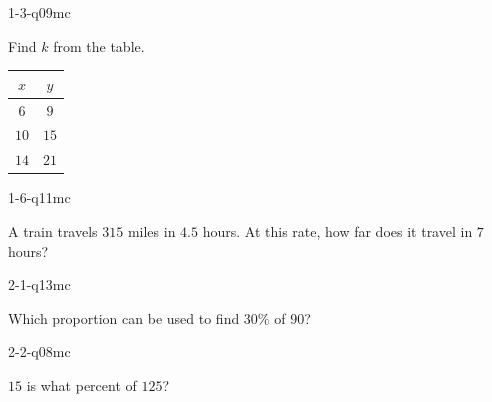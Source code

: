 
\begin{practiceQuestion}{1-3-q09}{mc}
\begin{questionText}
Find $k$ from the table.

\begin{center}
\begin{tabular}{|c|c|}
\hline $x$ & $y$ \\ \hline $6$ & $9$ \\ $10$ & $15$ \\ $14$ & $21$ \\ \hline
\end{tabular}
\end{center}
\end{questionText}
\end{practiceQuestion}

\begin{practiceQuestion}{1-6-q11}{mc}
\begin{questionText}
A train travels $315$ miles in $4.5$ hours. At this rate, how far does it travel in $7$ hours?
\end{questionText}
\end{practiceQuestion}

\begin{practiceQuestion}{2-1-q13}{mc}
\begin{questionText}
Which proportion can be used to find $30\%$ of $90$?
\end{questionText}
\end{practiceQuestion}

\begin{practiceQuestion}{2-2-q08}{mc}
\begin{questionText}
$15$ is what percent of $125$?
\end{questionText}
\end{practiceQuestion}

